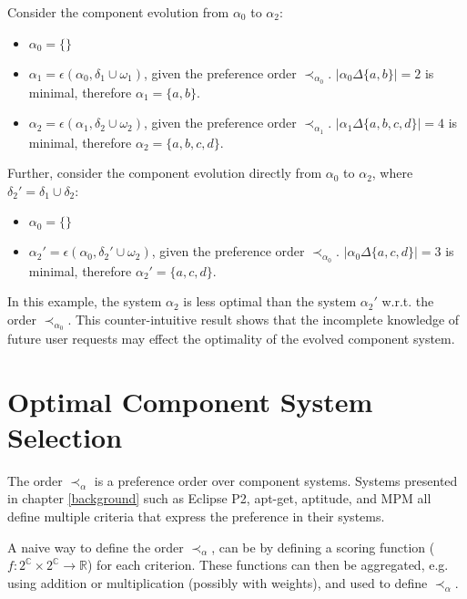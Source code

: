 Consider the component evolution from $\alpha_0$ to $\alpha_2$:
\begin{itemize}
  \item $\alpha_0 = \{\}$
  \item $\alpha_1 = \epsilon(\alpha_0,\delta_1 \cup \omega_1)$, given the preference order $\prec_{\alpha_0}$. $|\alpha_0 \Delta \{a,b\}| = 2$ is minimal, therefore $\alpha_1 = \{a,b\}$.
  \item $\alpha_2 = \epsilon(\alpha_1,\delta_2 \cup \omega_2)$, given the preference order $\prec_{\alpha_1}$. $|\alpha_1 \Delta \{a,b,c,d\}| = 4$ is minimal, therefore $\alpha_2 = \{a,b,c,d\}$.
\end{itemize}

Further, consider the component evolution directly from $\alpha_0$ to $\alpha_2$, where $\delta_2' = \delta_1 \cup \delta_2$:
\begin{itemize}
  \item $\alpha_0 = \{\}$
  \item $\alpha_2' = \epsilon(\alpha_0,\delta_2' \cup \omega_2)$, given the preference order $\prec_{\alpha_0}$. $|\alpha_0 \Delta \{a,c,d\}| = 3$ is minimal, therefore $\alpha_2' = \{a,c,d\}$.
\end{itemize}

In this example, the system $\alpha_2$ is less optimal than the system $\alpha_2'$ w.r.t. the order $\prec_{\alpha_0}$.
This counter-intuitive result shows that the incomplete knowledge of future user requests may effect the optimality of the evolved component system.

\section{Optimal Component System Selection}
\label{formal.opt}
The order $\prec_{\alpha}$ is a preference order over component systems.
Systems presented in chapter \ref{background} such as Eclipse P2, apt-get, aptitude, and MPM all define multiple criteria that express the preference in their systems.

A naive way to define the order $\prec_{\alpha}$, can be by defining a scoring function ($f: 2^{\mathbb{C}} \times 2^{\mathbb{C}} \rightarrow \mathbb{R}$) for each criterion. 
These functions can then be aggregated, e.g. using addition or multiplication (possibly with weights), and used to define $\prec_{\alpha}$.

